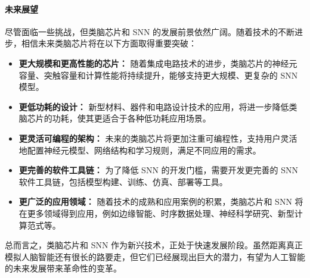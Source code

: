 \documentclass[12pt, a4paper, oneside]{ctexart}
\numberwithin{equation}{section}  %
\begin{document}
\paragraph{未来展望}

尽管面临一些挑战，但类脑芯片和 SNN 的发展前景依然广阔。随着技术的不断进步，相信未来类脑芯片将在以下方面取得重要突破：

\begin{itemize}
    \item \textbf{更大规模和更高性能的芯片：} 随着集成电路技术的进步，类脑芯片的神经元容量、突触容量和计算性能将持续提升，能够支持更大规模、更复杂的 SNN 模型。
    \item \textbf{更低功耗的设计：} 新型材料、器件和电路设计技术的应用，将进一步降低类脑芯片的功耗，使其更适合于各种低功耗应用场景。
    \item \textbf{更灵活可编程的架构：} 未来的类脑芯片将更加注重可编程性，支持用户灵活地配置神经元模型、网络结构和学习规则，满足不同应用的需求。
    \item \textbf{更完善的软件工具链：} 为了降低 SNN 的开发门槛，需要开发更完善的 SNN 软件工具链，包括模型构建、训练、仿真、部署等工具。
    \item \textbf{更广泛的应用领域：} 随着技术的成熟和应用案例的积累，类脑芯片和 SNN 将在更多领域得到应用，例如边缘智能、时序数据处理、神经科学研究、新型计算范式等。
\end{itemize}

总而言之，类脑芯片和 SNN 作为新兴技术，正处于快速发展阶段。虽然距离真正模拟人脑智能还有很长的路要走，但它们已经展现出巨大的潜力，有望为人工智能的未来发展带来革命性的变革。
\end{document}
